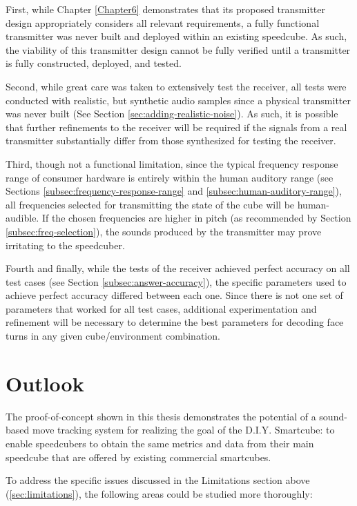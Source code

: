 First, while Chapter \ref{Chapter6} demonstrates that its proposed
transmitter design appropriately considers all relevant requirements, a
fully functional transmitter was never built and deployed within an
existing speedcube. As such, the viability of this transmitter design
cannot be fully verified until a transmitter is fully constructed,
deployed, and tested.

Second, while great care was taken to extensively test the receiver,
all tests were conducted with realistic, but synthetic audio samples
since a physical transmitter was never built (See Section
\ref{sec:adding-realistic-noise}). As such, it is possible that further
refinements to the receiver will be required if the signals from a real
transmitter substantially differ from those synthesized for testing the
receiver.

Third, though not a functional limitation, since the typical frequency
response range of consumer hardware is entirely within the human
auditory range (see Sections \ref{subsec:frequency-response-range} and
\ref{subsec:human-auditory-range}), all frequencies selected for
transmitting the state of the cube will be human-audible. If the chosen
frequencies are higher in pitch (as recommended by Section
\ref{subsec:freq-selection}), the sounds produced by the transmitter
may prove irritating to the speedcuber. 

Fourth and finally, while the tests of the receiver achieved perfect
accuracy on all test cases (see Section \ref{subsec:answer-accuracy}),
the specific parameters used to achieve perfect accuracy differed
between each one. Since there is not one set of parameters that worked
for all test cases, additional experimentation and refinement will be
necessary to determine the best parameters for decoding face turns in
any given cube/environment combination.


\section{Outlook}
\label{sec:outlook}

The proof-of-concept shown in this thesis demonstrates the potential of
a sound-based move tracking system for realizing the goal of the D.I.Y.
Smartcube: to enable speedcubers to obtain the same metrics and data
from their main speedcube that are offered by existing commercial
smartcubes.

To address the specific issues discussed in the Limitations section
above (\ref{sec:limitations}), the following areas could be studied
more thoroughly:

